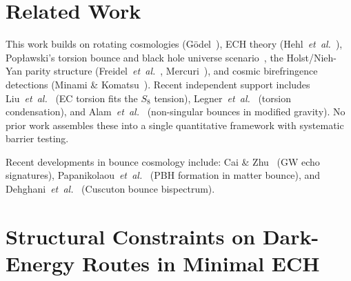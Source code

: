 \documentclass[aps,prd,twocolumn,superscriptaddress,showpacs,preprintnumbers,nofootinbib,longbibliography,floatfix]{revtex4-2}
\newcommand{\etal}{\textit{et~al.}}
\begin{document}
\section{Related Work}\label{sec:related}
This work builds on rotating cosmologies (G\"odel~\cite{Godel1949}), ECH theory
(Hehl~\etal~\cite{Hehl1976}), Pop\l{}awski's torsion bounce and black hole
universe scenario~\cite{Poplawski2012,Poplawski2016,Poplawski2010}, the
Holst/Nieh-Yan parity structure (Freidel~\etal~\cite{Freidel2005},
Mercuri~\cite{Mercuri2006,Mercuri2009}), and cosmic birefringence detections
(Minami \& Komatsu~\cite{Minami2020}). Recent independent support includes
Liu~\etal~\cite{ECTorsionDESI2025} (EC torsion fits the $S_8$ tension), Legner~\etal~\cite{Legner2025}
(torsion condensation), and Alam~\etal~\cite{Alam2025bounce} (non-singular bounces
in modified gravity). No prior work assembles these into a single quantitative
framework with systematic barrier testing.

Recent developments in bounce cosmology include: Cai \& Zhu~\cite{Cai:2026echoes}
(GW echo signatures), Papanikolaou~\etal~\cite{Papanikolaou:2024pbh} (PBH
formation in matter bounce), and Dehghani~\etal~\cite{Dehghani:2025cusc}
(Cuscuton bounce bispectrum).


\section{Structural Constraints on Dark-Energy Routes in Minimal ECH}\label{sec:barriers}
\end{document}
